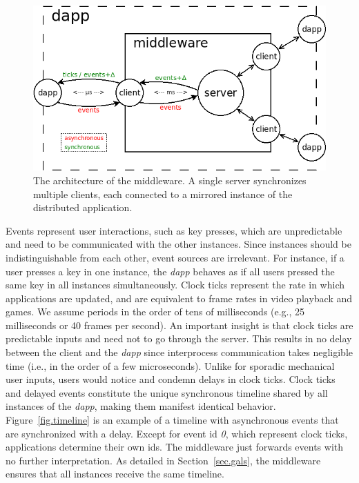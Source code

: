 \documentclass[sigplan,screen]{acmart}
\newcommand{\dapp}{\emph{dapp}\xspace}
\begin{document}
\begin{figure}[t]
  \centering
  \includegraphics[width=\linewidth]{middleware}
  \caption{
    \label{fig.middleware}
    The architecture of the middleware.
    A single server synchronizes multiple clients, each connected to a mirrored
    instance of the distributed application.
  }
\end{figure}

Events represent user interactions, such as key presses, which are
unpredictable and need to be communicated with the other instances.
Since instances should be indistinguishable from each other, event sources are
irrelevant.
For instance, if a user presses a key in one instance, the \dapp behaves as if
all users pressed the same key in all instances simultaneously.
%
Clock ticks represent the rate in which applications are updated, and are
equivalent to frame rates in video playback and games.
We assume periods in the order of tens of milliseconds (e.g., 25 milliseconds
or 40 frames per second).
An important insight is that clock ticks are predictable inputs and need not to
go through the server.
This results in no delay between the client and the \dapp since interprocess
communication takes negligible time (i.e., in the order of a few microseconds).
Unlike for sporadic mechanical user inputs, users would notice and condemn
delays in clock ticks.
%
Clock ticks and delayed events constitute the unique synchronous timeline
shared by all instances of the \dapp, making them manifest identical behavior.
Figure~\ref{fig.timeline} is an example of a timeline with asynchronous events
that are synchronized with a delay.
Except for event id \emph{0}, which represent clock ticks, applications
determine their own ids.
The middleware just forwards events with no further interpretation.
As detailed in Section~\ref{sec.gals}, the middleware ensures that all
instances receive the same timeline.
\end{document}
